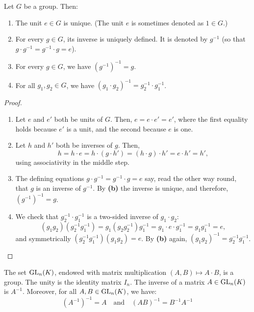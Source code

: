 \begin{proposition}
\label{prop:group_basic_properties}
Let $G$ be a group. Then:
\begin{enumerate}
    \item The unit $e \in G$ is unique. (The unit $e$ is sometimes denoted as $1 \in G$.)
    \item For every $g \in G$, its inverse is uniquely defined. It is denoted by $g^{-1}$ (so that $g \cdot g^{-1} = g^{-1} \cdot g = e$).
    \item For every $g \in G$, we have $(g^{-1})^{-1} = g$.
    \item For all $g_1, g_2 \in G$, we have $(g_1 \cdot g_2)^{-1} = g_2^{-1} \cdot g_1^{-1}$.
\end{enumerate}
\end{proposition}

\begin{proof}
\begin{enumerate}
    \item Let $e$ and $e'$ both be units of $G$. Then, $e = e \cdot e' = e'$, where the first equality holds because $e'$ is a unit, and the second because $e$ is one.
    \item Let $h$ and $h'$ both be inverses of $g$. Then,
    \[
    h = h \cdot e = h \cdot (g \cdot h') = (h \cdot g) \cdot h' = e \cdot h' = h',
    \]
    using associativity in the middle step.
    \item The defining equations $g \cdot g^{-1} = g^{-1} \cdot g = e$ say, read the other way round, that $g$ is an inverse of $g^{-1}$. By \textbf{(b)} the inverse is unique, and therefore, $(g^{-1})^{-1} = g$.
    \item We check that $g_2^{-1} \cdot g_1^{-1}$ is a two-sided inverse of $g_1 \cdot g_2$:
    \[
    (g_1 g_2)(g_2^{-1} g_1^{-1}) = g_1 (g_2 g_2^{-1}) g_1^{-1} = g_1 \cdot e \cdot g_1^{-1} = g_1 g_1^{-1} = e,
    \]
    and symmetrically $(g_2^{-1} g_1^{-1})(g_1 g_2) = e$. By \textbf{(b)} again, $(g_1 g_2)^{-1} = g_2^{-1} g_1^{-1}$.
\end{enumerate}
\end{proof}

\begin{proposition}
\label{prop:gl_group_structure}
The set $\operatorname{GL}_n(K)$, endowed with matrix multiplication $(A, B) \mapsto A \cdot B$, is a group. The unity is the identity matrix $I_n$. The inverse of a matrix $A \in \operatorname{GL}_n(K)$ is $A^{-1}$. Moreover, for all $A, B \in \operatorname{GL}_n(K)$, we have:
\begin{equation*}
    (A^{-1})^{-1} = A \quad \text{and} \quad (AB)^{-1} = B^{-1}A^{-1}
\end{equation*}
\end{proposition}


